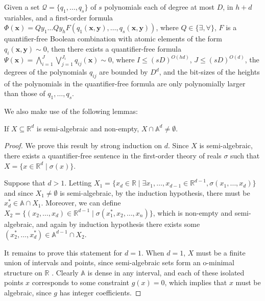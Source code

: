 \begin{theorem}
  \label{thm:quant-elim}
  Given a set $\mathcal{Q}=\lbrace q_1,\ldots,q_s\rbrace$ of $s$
  polynomials each of degree at most $D$, in $h+d$ variables, and a
  first-order formula $\Phi(\boldsymbol x)=Q y_1 \ldots Q y_h
  F(q_1(\boldsymbol x,\boldsymbol y),\ldots,q_s(\boldsymbol
  x,\boldsymbol y))$, where $Q\in\lbrace \exists,\forall\rbrace$, $F$
  is a quantifier-free Boolean combination with atomic elements of the
  form $q_i(\boldsymbol x,\boldsymbol y)\sim 0$, then there exists a
  quantifier-free formula $\Psi(\boldsymbol
  x)=\bigwedge_{i=1}^J\bigvee_{j=1}^{J_i}q_{ij}(\boldsymbol x)\sim 0$,
  where $I\leq (sD)^{O(hd)}$, $J\leq (sD)^{O(d)}$, the degrees of the
  polynomials $q_{ij}$ are bounded by $D^d$, and the bit-sizes of the
  heights of the polynomials in the quantifier-free formula are only
  polynomially larger than those of $q_1,\ldots,q_s$.
\end{theorem}

We also make use of the following lemmas:
\begin{lemma}
  If $X\subseteq\mathbb{R}^d$ is semi-algebraic and non-empty,
  $X\cap\mathbb{A}^d\neq\emptyset$.
\end{lemma}

\begin{proof}
  We prove this result by strong induction on $d$. Since $X$ is
  semi-algebraic, there exists a quantifier-free sentence in the
  first-order theory of reals $\sigma$ such that $X=\lbrace
  x\in\mathbb{R}^d\mid \sigma(x)\rbrace$.

  Suppose that $d>1$. Letting $X_1=\lbrace x_d\in\mathbb{R}\mid
  \exists
  x_1,\ldots,x_{d-1}\in\mathbb{R}^{d-1},\sigma(x_1,\ldots,x_d)\rbrace$
  and since $X_1\neq\emptyset$ is semi-algebraic, by the induction
  hypothesis, there must be $x_d^*\in\mathbb{A}\cap X_1$. Moreover, we
  can define $X_2=\lbrace (x_2,\ldots,x_d)\in\mathbb{R}^{d-1}\mid
  \sigma(x_1^*,x_2,\ldots,x_n)\rbrace$, which is non-empty and
  semi-algebraic, and again by induction hypothesis there exists some
  $(x_2^*,\ldots,x_d^*)\in\mathbb{A}^{d-1}\cap X_2$.

  It remains to prove this statement for $d=1$. When $d=1$, $X$ must
  be a finite union of intervals and points, since semi-algebraic sets
  form an o-minimal structure on $\mathbb{R}$ \cite{Tar51}. Clearly
  $\mathbb{A}$ is dense in any interval, and each of these isolated
  points $x$ corresponds to some constraint $g(x)=0$, which implies
  that $x$ must be algebraic, since $g$ has integer coefficients.
\end{proof}

